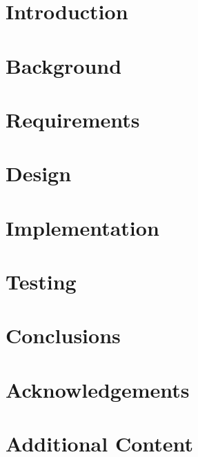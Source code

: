 \documentclass[12pt, twoside]{report}
\begin{document}
  

  \newpage
  \thispagestyle{empty}
  \mbox{}
  \newpage

  \setcounter{page}{1}
  

  \clearpage
    \printglossaries
  \clearpage

  \tableofcontents
  \clearpage

  \chapter{Introduction} \label{introduction}
    

  \chapter{Background} \label{background}
    

  \chapter{Requirements} \label{requirements}
    

  \chapter{Design} \label{design}
    

  \chapter{Implementation} \label{implementation}
    

  \chapter{Testing} \label{testing}
    

  \chapter{Conclusions} \label{conclusions}
    

  \chapter*{Acknowledgements} \label{acknowledgements}
    

  \appendix

  \chapter{Additional Content} \label{additional}
    

  \clearpage
    
\end{document}
